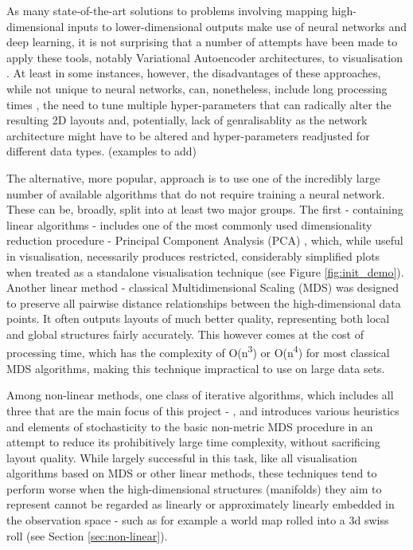 \documentclass{l4proj}
\begin{document}
As many state-of-the-art solutions to problems involving mapping high-dimensional inputs to lower-dimensional outputs make use of neural networks and deep learning, it is not surprising that a number of attempts have been made to apply these tools, notably Variational Autoencoder architectures, to visualisation \citep{ nn_vis1, nn_vis2, nn_vis3, nn_vis4, nn_vis5, nn_vis6, nn_vis7}. At least in some instances, however, the disadvantages of these approaches, while not unique to neural networks, can, nonetheless, include long processing times \citep{nn_vis5}, the need to tune multiple hyper-parameters that can radically alter the resulting 2D layouts \citep{nn_vis5, nn_vis6} and, potentially, lack of genralisablity as the network architecture might have to be altered and hyper-parameters readjusted for different data types. (examples to add)

The alternative, more popular, approach is to use one of the incredibly large number of available algorithms that do not require training a neural network. These can be, broadly, split into at least two major groups. The first - containing linear algorithms - includes one of the most commonly used dimensionality reduction procedure - Principal Component Analysis (PCA) \citep{pca}, which, while useful in visualisation, necessarily produces restricted, considerably simplified plots when treated as a standalone visualisation technique (see  Figure \ref{fig:init_demo}). Another linear method - classical Multidimensional Scaling (MDS) \citep{mds} was designed to preserve all pairwise distance relationships between the high-dimensional data points. It often outputs layouts of much better quality, representing both local and global structures fairly accurately. This however comes at the cost of processing time, which has the complexity of O(n\textsuperscript{3}) or O(n\textsuperscript{4}) for most classical MDS algorithms, making this technique impractical to use on large data sets.

Among non-linear methods, one class of iterative algorithms, which includes all three that are the main focus of this project - \citet{Chalmers96}, \citet{hyrid} and \citet{squad} introduces various heuristics and elements of stochasticity to the basic non-metric MDS procedure in an attempt to reduce its prohibitively large time complexity, without sacrificing layout quality. While largely successful in this task, like all visualisation algorithms based on MDS or other linear methods, these techniques tend to perform worse when the high-dimensional structures (manifolds) they aim to represent cannot be regarded as linearly or approximately linearly embedded in the observation space \citep{swissroll} - such as for example a world map rolled into a 3d swiss roll (see Section \ref{sec:non-linear}).  
\end{document}
